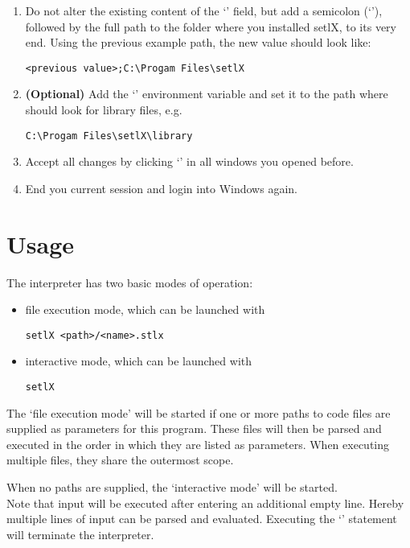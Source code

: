 \begin{enumerate}
\begin{enumerate}
		\item Do not alter the existing content of the `' field, but add a semicolon (`\command{;}'), followed by the full path to the folder where you installed setlX, to its very end. Using the previous example path, the new value should look like:
\begin{lstlisting}[frame=none,numbers=none]
<previous value>;C:\Progam Files\setlX
\end{lstlisting}
		\item \textbf{(Optional)} Add the `' environment variable and set it to the path where \setlX{} should look for library files, e.g.
\begin{lstlisting}[frame=none,numbers=none]
C:\Progam Files\setlX\library
\end{lstlisting}
		\item Accept all changes by clicking `' in all windows you opened before.
		\item End you current session and login into Windows again.
	\end{enumerate}
\end{enumerate}

\newpage

\section{Usage}

The \setlX{} interpreter has two basic modes of operation:

\begin{itemize}
	\item file execution mode, which can be launched with
\begin{lstlisting}[frame=none,numbers=none]
setlX <path>/<name>.stlx
\end{lstlisting}
	\item interactive mode, which can be launched with
\begin{lstlisting}[frame=none,numbers=none]
setlX
\end{lstlisting}
\end{itemize}

The `file execution mode' will be started if one or more paths to code files are supplied as parameters for this program. These files will then be parsed and executed in the order in which they are listed as parameters. When executing multiple files, they share the outermost scope.

When no paths are supplied, the `interactive mode' will be started.\\
Note that input will be executed after entering an additional empty line. Hereby multiple lines of input can be parsed and evaluated. Executing the `' statement will terminate the interpreter.

